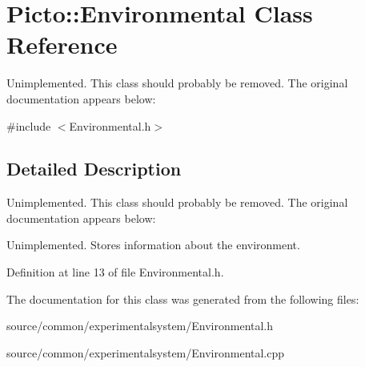 \hypertarget{class_picto_1_1_environmental}{\section{Picto\-:\-:Environmental Class Reference}
\label{class_picto_1_1_environmental}
}


Unimplemented. This class should probably be removed. The original documentation appears below\-:  




{\ttfamily \#include $<$Environmental.\-h$>$}



\subsection{Detailed Description}
Unimplemented. This class should probably be removed. The original documentation appears below\-: 

Unimplemented. Stores information about the environment. 

Definition at line 13 of file Environmental.\-h.



The documentation for this class was generated from the following files\-:\begin{DoxyCompactItemize}
\item 
source/common/experimentalsystem/Environmental.\-h\item 
source/common/experimentalsystem/Environmental.\-cpp\end{DoxyCompactItemize}

